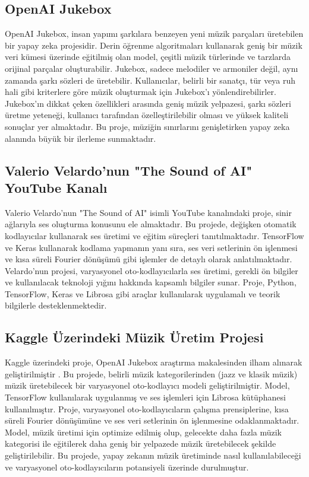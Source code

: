 \documentclass[12pt, a4paper]{article}
\begin{document}
	\subsection*{OpenAI Jukebox}
	OpenAI Jukebox, insan yapımı şarkılara benzeyen yeni müzik parçaları üretebilen bir yapay zeka projesidir. Derin öğrenme algoritmaları kullanarak geniş bir müzik veri kümesi üzerinde eğitilmiş olan model, çeşitli müzik türlerinde ve tarzlarda orijinal parçalar oluşturabilir. Jukebox, sadece melodiler ve armoniler değil, aynı zamanda şarkı sözleri de üretebilir. Kullanıcılar, belirli bir sanatçı, tür veya ruh hali gibi kriterlere göre müzik oluşturmak için Jukebox'ı yönlendirebilirler. Jukebox'ın dikkat çeken özellikleri arasında geniş müzik yelpazesi, şarkı sözleri üretme yeteneği, kullanıcı tarafından özelleştirilebilir olması ve yüksek kaliteli sonuçlar yer almaktadır. Bu proje, müziğin sınırlarını genişletirken yapay zeka alanında büyük bir ilerleme sunmaktadır\cite{jukebox}.
	
	\subsection*{Valerio Velardo'nun "The Sound of AI" YouTube Kanalı}
	Valerio Velardo'nun "The Sound of AI" isimli YouTube kanalındaki proje, sinir ağlarıyla ses oluşturma konusunu ele almaktadır. Bu projede, değişken otomatik kodlayıcılar kullanarak ses üretimi ve eğitim süreçleri tanıtılmaktadır. TensorFlow ve Keras kullanarak kodlama yapmanın yanı sıra, ses veri setlerinin ön işlenmesi ve kısa süreli Fourier dönüşümü gibi işlemler de detaylı olarak anlatılmaktadır. Velardo'nun projesi, varyasyonel oto-kodlayıcılarla ses üretimi, gerekli ön bilgiler ve kullanılacak teknoloji yığını hakkında kapsamlı bilgiler sunar. Proje, Python, TensorFlow, Keras ve Librosa gibi araçlar kullanılarak uygulamalı ve teorik bilgilerle desteklenmektedir\cite{vvAi}.
	
	\subsection*{Kaggle Üzerindeki Müzik Üretim Projesi}
	Kaggle üzerindeki proje, OpenAI Jukebox araştırma makalesinden ilham alınarak geliştirilmiştir \cite{kaggleCode}. Bu projede, belirli müzik kategorilerinden (jazz ve klasik müzik) müzik üretebilecek bir varyasyonel oto-kodlayıcı modeli geliştirilmiştir. Model, TensorFlow kullanılarak uygulanmış ve ses işlemleri için Librosa kütüphanesi kullanılmıştır. Proje, varyasyonel oto-kodlayıcıların çalışma prensiplerine, kısa süreli Fourier dönüşümüne ve ses veri setlerinin ön işlenmesine odaklanmaktadır. Model, müzik üretimi için optimize edilmiş olup, gelecekte daha fazla müzik kategorisi ile eğitilerek daha geniş bir yelpazede müzik üretebilecek şekilde geliştirilebilir. Bu projede, yapay zekanın müzik üretiminde nasıl kullanılabileceği ve varyasyonel oto-kodlayıcıların potansiyeli üzerinde durulmuştur.
	
\end{document}
